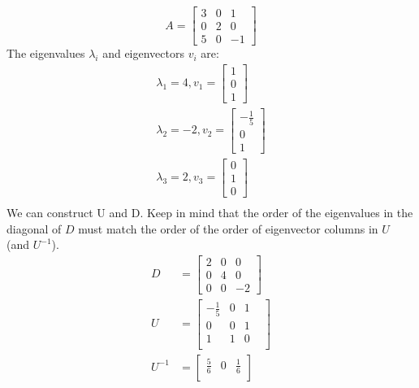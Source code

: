 \begin{example}
    \begin{equation*}
        A = \begin{bmatrix}
            3 & 0 & 1 \\ 0 & 2 & 0  \\ 5 & 0 & -1
        \end{bmatrix}
    \end{equation*}
    The eigenvalues $\lambda_i$ and eigenvectors $v_i$ are:
    \begin{gather*}
        \lambda_1 = 4, v_1 = \begin{bmatrix}
            1 \\ 0 \\ 1
        \end{bmatrix}  \\
        \lambda_2 = -2, v_2 = \begin{bmatrix}
            -\frac{1}{5} \\ 0 \\ 1
        \end{bmatrix} \\
        \lambda_3 = 2, v_3 = \begin{bmatrix}
            0 \\ 1 \\ 0
        \end{bmatrix}  \\
    \end{gather*}
    We can construct U and D. Keep in mind that the order of the eigenvalues in the diagonal of $D$ must match the order of the order of eigenvector columns in $U$ (and $U^{-1}$).
    \begin{align*}
        D      & = \begin{bmatrix}
            2 & 0 & 0 \\ 0 & 4 & 0 \\ 0 & 0 & -2
        \end{bmatrix}  \\
        U      & =  \begin{bmatrix}
            -\frac{1}{5} & 0 & 1   \\
            0            & 0 & 1 & \\
            1            & 1 & 0   \\
        \end{bmatrix} \\
        U^{-1} & = \begin{bmatrix}
            \frac{5}{6}   & 0 & \frac{1}{6} \\

\end{bmatrix}
\end{align*}
\end{example}
